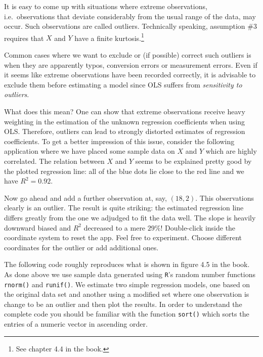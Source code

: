 \documentclass[]{book}
\let\rmarkdownfootnote\footnote%
\def\footnote{\protect\rmarkdownfootnote}
\theoremstyle{definition}
\theoremstyle{definition}
\theoremstyle{definition}
\theoremstyle{remark}
\begin{document}
It is easy to come up with situations where extreme observations,
i.e.~observations that deviate considerably from the usual range of the
data, may occur. Such observations are called outliers. Technically
speaking, assumption \#3 requires that \(X\) and \(Y\) have a finite
kurtosis.\footnote{See chapter 4.4 in the book.}

Common cases where we want to exclude or (if possible) correct such
outliers is when they are apparently typos, conversion errors or
measurement errors. Even if it seems like extreme observations have been
recorded correctly, it is advisable to exclude them before estimating a
model since OLS suffers from \emph{sensitivity to outliers}.

What does this mean? One can show that extreme observations receive
heavy weighting in the estimation of the unknown regression coefficients
when using OLS. Therefore, outliers can lead to strongly distorted
estimates of regression coefficients. To get a better impression of this
issue, consider the following application where we have placed some
sample data on \(X\) and \(Y\) which are highly correlated. The relation
between \(X\) and \(Y\) seems to be explained pretty good by the plotted
regression line: all of the blue dots lie close to the red line and we
have \(R^2=0.92\).

Now go ahead and add a further observation at, say, \((18,2)\). This
observations clearly is an outlier. The result is quite striking: the
estimated regression line differs greatly from the one we adjudged to
fit the data well. The slope is heavily downward biased and \(R^2\)
decreased to a mere \(29\%\)! Double-click inside the coordinate system
to reset the app. Feel free to experiment. Choose different coordinates
for the outlier or add additional ones.

The following code roughly reproduces what is shown in figure 4.5 in the
book. As done above we use sample data generated using \texttt{R}'s
random number functions \texttt{rnorm()} and \texttt{runif()}. We
estimate two simple regression models, one based on the original data
set and another using a modified set where one observation is change to
be an outlier and then plot the results. In order to understand the
complete code you should be familiar with the function \texttt{sort()}
which sorts the entries of a numeric vector in ascending order.
\end{document}
